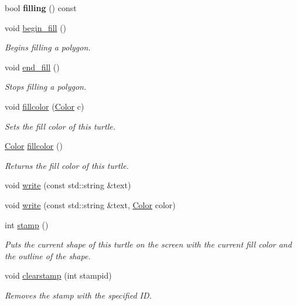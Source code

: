 \begin{DoxyCompactItemize}
bool {\bfseries filling} () const
\item 
void \hyperlink{classcturtle_1_1Turtle_a5d441494084c38e8947205a19f70ce73}{begin\+\_\+fill} ()
\begin{DoxyCompactList}\small\item\em Begins filling a polygon. \end{DoxyCompactList}\item 
void \hyperlink{classcturtle_1_1Turtle_aaf0576f0492ba3c4b1afa5bea50b9ddb}{end\+\_\+fill} ()
\begin{DoxyCompactList}\small\item\em Stops filling a polygon. \end{DoxyCompactList}\item 
void \hyperlink{classcturtle_1_1Turtle_a222a95d61c5cfee661f5244e51d57539}{fillcolor} (\hyperlink{classcturtle_1_1Color}{Color} c)
\begin{DoxyCompactList}\small\item\em Sets the fill color of this turtle. \end{DoxyCompactList}\item 
\hyperlink{classcturtle_1_1Color}{Color} \hyperlink{classcturtle_1_1Turtle_aa35fb43f969187b513d5a1f443e98569}{fillcolor} ()
\begin{DoxyCompactList}\small\item\em Returns the fill color of this turtle. \end{DoxyCompactList}\item 
void \hyperlink{classcturtle_1_1Turtle_a6e814845ac619a90aeee25a67a3fc51d}{write} (const std\+::string \&text)
\item 
void \hyperlink{classcturtle_1_1Turtle_afa05ae8897410f6ff0ed6578ddf004f3}{write} (const std\+::string \&text, \hyperlink{classcturtle_1_1Color}{Color} color)
\item 
int \hyperlink{classcturtle_1_1Turtle_af7b7e9c43e22fabce3a5435d09c73f77}{stamp} ()
\begin{DoxyCompactList}\small\item\em Puts the current shape of this turtle on the screen with the current fill color and the outline of the shape. \end{DoxyCompactList}\item 
\mbox{\label{classcturtle_1_1Turtle_a9e1dea0d65c8cc1e4627e28b20390eb2}} 
void \hyperlink{classcturtle_1_1Turtle_a9e1dea0d65c8cc1e4627e28b20390eb2}{clearstamp} (int stampid)
\begin{DoxyCompactList}\small\item\em Removes the stamp with the specified ID. \end{DoxyCompactList}\item 

\end{DoxyCompactItemize}
